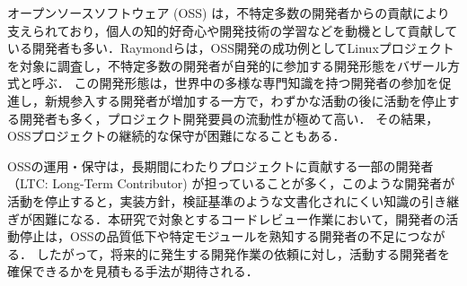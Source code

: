 \documentclass[submit,noauthor,ses,dvipdfmx]{ipsj}
\newcommand{\todo}[1]{\colorbox{yellow}{{\bf TODO}:}{\color{red} {\textbf{[#1]}}}}
\begin{document}
オープンソースソフトウェア (OSS) は，不特定多数の開発者からの貢献により支えられており，個人の知的好奇心や開発技術の学習などを動機として貢献している開発者も多い\cite{motivation}．Raymondらは，OSS開発の成功例としてLinuxプロジェクトを対象に調査し，不特定多数の開発者が自発的に参加する開発形態をバザール方式と呼ぶ\cite{bazzar}．
この開発形態は，世界中の多様な専門知識を持つ開発者の参加を促進し，新規参入する開発者が増加する一方で，わずかな活動の後に活動を停止する開発者も多く，プロジェクト開発要員の流動性が極めて高い\cite{dynamics}．%
その結果，OSSプロジェクトの継続的な保守が困難になることもある\cite{pinto_otc}．

OSSの運用・保守は，長期間にわたりプロジェクトに貢献する一部の開発者（LTC: Long-Term Contributor) が担っていることが多く，このような開発者が活動を停止すると，実装方針，検証基準のような文書化されにくい知識の引き継ぎが困難になる．本研究で対象とするコードレビュー作業において，開発者の活動停止は，OSSの品質低下や特定モジュールを熟知する開発者の不足につながる\cite{bacchelli}\cite{mcintosh}．
したがって，将来的に発生する開発作業の依頼に対し，活動する開発者を確保できるかを見積もる手法が期待される．
\end{document}
